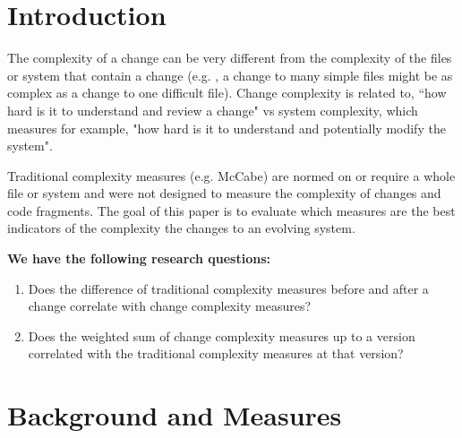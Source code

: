 \documentclass[8pt,twocolumn,a4paper]{article}
\newcommand*{\eg}{e.g. }
\begin{document}
\section{Introduction}

The complexity of a change can be very different from the complexity of the
files or system that contain a change (\eg, a change to many simple files
might be as complex as a change to one difficult file). Change complexity is
related to, ``how hard is it to understand and review a change" vs system
complexity, which measures for example, "how hard is it to understand and
potentially modify the system". 

Traditional complexity measures (\eg McCabe) are normed on or require a whole
file or system and were not designed to measure the complexity of changes and
code fragments. The goal of this paper is to evaluate which measures are the
best indicators of the complexity the changes to an evolving system. 


\textbf{We have the following research questions:}

\begin{enumerate}

\item Does the difference of traditional complexity measures before and after a change correlate with change complexity measures?

\item Does the weighted sum of change complexity measures up to a version correlated with the traditional complexity measures at that version? 

\end{enumerate}

\section{Background and Measures}
\end{document}
